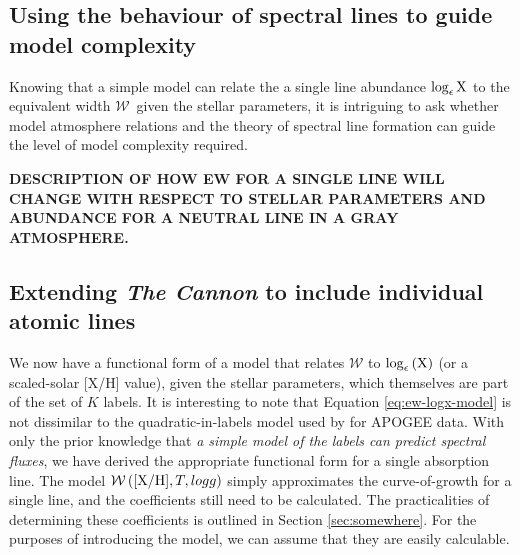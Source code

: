 \documentclass[useAMS,usenatbib]{mn2e}
\newcommand\tc{\textit{The Cannon}}
\newcommand\ew{$\mathcal{W}$}
\begin{document}






\subsection{Using the behaviour of spectral lines to guide model complexity}

Knowing that a simple model can relate the a single line abundance 
$\log_{\epsilon}{\rm X}$ to the equivalent width \ew\, given the stellar
parameters, it is intriguing to ask whether model atmosphere relations and
the theory of spectral line formation can guide the level of model complexity
required.





\textbf{DESCRIPTION OF HOW EW FOR A SINGLE LINE WILL CHANGE WITH RESPECT TO STELLAR PARAMETERS AND ABUNDANCE FOR A NEUTRAL LINE IN A GRAY ATMOSPHERE.}


\subsection{Extending \tc{} to include individual atomic lines}

We now have a functional form of a model that relates $\mathcal{W}$ to $\log_\epsilon\left({\textrm X}\right)$ (or a scaled-solar [X/H] value), given the stellar parameters, which themselves are part of the set of $K$ labels. It is interesting to note that Equation \ref{eq:ew-logx-model} is not dissimilar to the quadratic-in-labels model used by \citet{Ness15a} for APOGEE data. With only the prior knowledge that \textit{a simple model of the labels can predict spectral fluxes}, we have derived the appropriate functional form for a single absorption line. The model $\mathcal{W}\left({\rm [X/H]}, T, logg\right)$ simply approximates the curve-of-growth for a single line, and the coefficients still need to be calculated. The practicalities of determining these coefficients is outlined in Section \ref{sec:somewhere}. For the purposes of introducing the model, we can assume that they are easily calculable.
\end{document}

